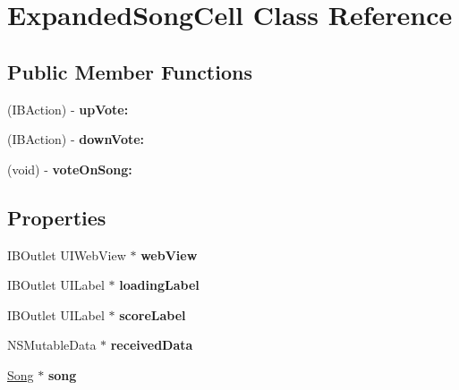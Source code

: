 \hypertarget{interface_expanded_song_cell}{\section{Expanded\-Song\-Cell Class Reference}
\label{interface_expanded_song_cell}
}
\subsection*{Public Member Functions}
\begin{DoxyCompactItemize}
\item 
\hypertarget{interface_expanded_song_cell_ad753b39854964d8c4244af1cea0b557d}{(I\-B\-Action) -\/ {\bfseries up\-Vote\-:}}\label{interface_expanded_song_cell_ad753b39854964d8c4244af1cea0b557d}

\item 
\hypertarget{interface_expanded_song_cell_a6d149d2ab6c5b797b2bdfb0aa9016642}{(I\-B\-Action) -\/ {\bfseries down\-Vote\-:}}\label{interface_expanded_song_cell_a6d149d2ab6c5b797b2bdfb0aa9016642}

\item 
\hypertarget{interface_expanded_song_cell_a5fa6f1d8bf956bde08f405b1f719faff}{(void) -\/ {\bfseries vote\-On\-Song\-:}}\label{interface_expanded_song_cell_a5fa6f1d8bf956bde08f405b1f719faff}

\end{DoxyCompactItemize}
\subsection*{Properties}
\begin{DoxyCompactItemize}
\item 
\hypertarget{interface_expanded_song_cell_afbd73894706a75c9fbf68d7b6ff33f6c}{I\-B\-Outlet U\-I\-Web\-View $\ast$ {\bfseries web\-View}}\label{interface_expanded_song_cell_afbd73894706a75c9fbf68d7b6ff33f6c}

\item 
\hypertarget{interface_expanded_song_cell_a2c56bbf2ac05c839c088de619aac0cd5}{I\-B\-Outlet U\-I\-Label $\ast$ {\bfseries loading\-Label}}\label{interface_expanded_song_cell_a2c56bbf2ac05c839c088de619aac0cd5}

\item 
\hypertarget{interface_expanded_song_cell_aecc623a9c8837b2511980cb2dd331cf4}{I\-B\-Outlet U\-I\-Label $\ast$ {\bfseries score\-Label}}\label{interface_expanded_song_cell_aecc623a9c8837b2511980cb2dd331cf4}

\item 
\hypertarget{interface_expanded_song_cell_a376d66eecd90a802c8298102a4f3aa0e}{N\-S\-Mutable\-Data $\ast$ {\bfseries received\-Data}}\label{interface_expanded_song_cell_a376d66eecd90a802c8298102a4f3aa0e}

\item 
\hypertarget{interface_expanded_song_cell_ae9b1ac180e8b5ae80de5cf8535d03c82}{\hyperlink{interface_song}{Song} $\ast$ {\bfseries song}}\label{interface_expanded_song_cell_ae9b1ac180e8b5ae80de5cf8535d03c82}

\end{DoxyCompactItemize}



